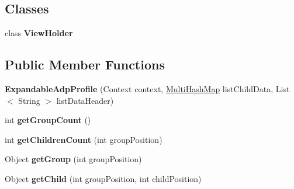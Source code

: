 \subsection*{Classes}
\begin{DoxyCompactItemize}
\item 
class {\bfseries View\+Holder}
\end{DoxyCompactItemize}
\subsection*{Public Member Functions}
\begin{DoxyCompactItemize}
\item 
{\bfseries Expandable\+Adp\+Profile} (Context context, \hyperlink{classcom_1_1example_1_1sebastian_1_1tindertp_1_1commonTools_1_1MultiHashMap}{Multi\+Hash\+Map} list\+Child\+Data, List$<$ String $>$ list\+Data\+Header)\hypertarget{classcom_1_1example_1_1sebastian_1_1tindertp_1_1ExpandedListAdapters_1_1ExpandableAdpProfile_a6e3ffdc92588ac8e7647d88c7710fdc5}{}\label{classcom_1_1example_1_1sebastian_1_1tindertp_1_1ExpandedListAdapters_1_1ExpandableAdpProfile_a6e3ffdc92588ac8e7647d88c7710fdc5}

\item 
int {\bfseries get\+Group\+Count} ()\hypertarget{classcom_1_1example_1_1sebastian_1_1tindertp_1_1ExpandedListAdapters_1_1ExpandableAdpProfile_aa6cce53b760df4d035a2ac0058522de2}{}\label{classcom_1_1example_1_1sebastian_1_1tindertp_1_1ExpandedListAdapters_1_1ExpandableAdpProfile_aa6cce53b760df4d035a2ac0058522de2}

\item 
int {\bfseries get\+Children\+Count} (int group\+Position)\hypertarget{classcom_1_1example_1_1sebastian_1_1tindertp_1_1ExpandedListAdapters_1_1ExpandableAdpProfile_a8425e893bd16b39f5b298987bbb72e59}{}\label{classcom_1_1example_1_1sebastian_1_1tindertp_1_1ExpandedListAdapters_1_1ExpandableAdpProfile_a8425e893bd16b39f5b298987bbb72e59}

\item 
Object {\bfseries get\+Group} (int group\+Position)\hypertarget{classcom_1_1example_1_1sebastian_1_1tindertp_1_1ExpandedListAdapters_1_1ExpandableAdpProfile_a3fa67deb46abc692281a926f763f85e3}{}\label{classcom_1_1example_1_1sebastian_1_1tindertp_1_1ExpandedListAdapters_1_1ExpandableAdpProfile_a3fa67deb46abc692281a926f763f85e3}

\item 
Object {\bfseries get\+Child} (int group\+Position, int child\+Position)\hypertarget{classcom_1_1example_1_1sebastian_1_1tindertp_1_1ExpandedListAdapters_1_1ExpandableAdpProfile_a6083b37c389815655c93af85fa0f7bfa}{}\label{classcom_1_1example_1_1sebastian_1_1tindertp_1_1ExpandedListAdapters_1_1ExpandableAdpProfile_a6083b37c389815655c93af85fa0f7bfa}


\end{DoxyCompactItemize}
